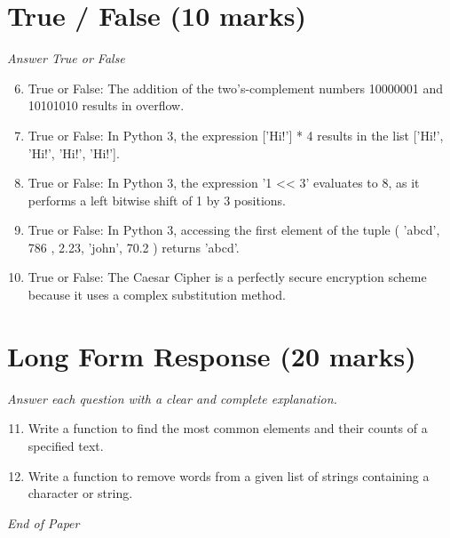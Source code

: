 \documentclass[12pt]{article}
\begin{document}
\section*{True / False (10 marks)}
\textit{Answer True or False}
\begin{enumerate}[label=\arabic*.]
\setcounter{enumi}{5}
\item True or False: The addition of the two's-complement numbers 10000001 and 10101010 results in overflow.
\item True or False: In Python 3, the expression ['Hi!'] * 4 results in the list ['Hi!', 'Hi!', 'Hi!', 'Hi!'].
\item True or False: In Python 3, the expression '1 \textless{}\textless{} 3' evaluates to 8, as it performs a left bitwise shift of 1 by 3 positions.
\item True or False: In Python 3, accessing the first element of the tuple ( 'abcd', 786 , 2.23, 'john', 70.2 ) returns 'abcd'.
\item True or False: The Caesar Cipher is a perfectly secure encryption scheme because it uses a complex substitution method.
\end{enumerate}

\section*{Long Form Response (20 marks)}
\textit{Answer each question with a clear and complete explanation.}
\begin{enumerate}[label=\arabic*.]
\setcounter{enumi}{10}
\item Write a function to find the most common elements and their counts of a specified text.
\item Write a function to remove words from a given list of strings containing a character or string.
\end{enumerate}

\vfill
\noindent\textit{End of Paper}
\end{document}
